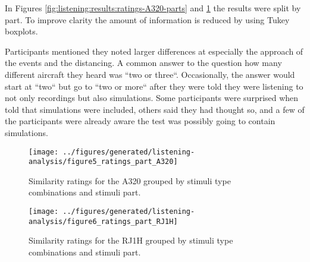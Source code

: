 %
%
%

In Figures \ref{fig:listening:results:ratings-A320-parts} and
\ref{fig:listening:results:ratings-RJ1H-parts} the results were split by part.
To improve clarity the amount of information is reduced by using Tukey boxplots.

Participants mentioned they noted larger differences at especially the approach of the events and the distancing.
A common answer to the question how many different aircraft they heard was ``two or three``.
Occasionally, the answer would start at ``two`` but go to ``two or more`` after they
were told they were listening to not only recordings but also simulations. Some
participants were surprised when told that simulations were included,
others said they had thought so, and a few of the participants were already
aware the test was possibly going to contain simulations.
%
\begin{figure}[H]
  \centering
  \texttt{[image: ../figures/generated/listening-analysis/figure5\_ratings\_part\_A320]}
  \caption{Similarity ratings for the A320 grouped by stimuli type combinations and stimuli part.}
  \label{fig:listening:results:ratings-A320-parts}

  \centering
  \texttt{[image: ../figures/generated/listening-analysis/figure6\_ratings\_part\_RJ1H]}
  \caption{Similarity ratings for the RJ1H grouped by stimuli type combinations and stimuli part.}
  \label{fig:listening:results:ratings-RJ1H-parts}
\end{figure}

